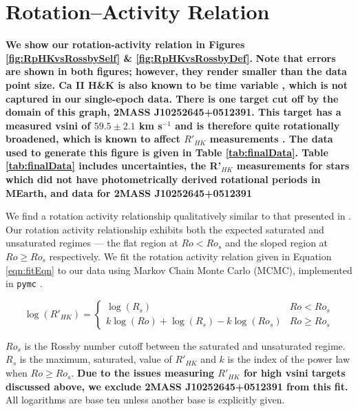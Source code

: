 \section{Rotation--Activity Relation}\label{sec:results}
\textbf{We show our rotation-activity relation in Figures
\ref{fig:RpHKvsRossbySelf} \& \ref{fig:RpHKvsRossbyDef}. }\textbf{Note that
errors are shown in both figures; however, they render smaller than the data
point size. Ca II H\&K is also known to be time variable
\citep[e.g.][]{Baroch2020,Perdelwitz2021}, which is not captured in our
single-epoch data. There is one target cut off by the domain of this graph,
2MASS J10252645+0512391. This target has a measured vsini of $59.5\pm2.1$ km
s$^{-1}$ \citep{Kesseli2018} and is therefore quite rotationally broadened, which
is known to affect $R'_{HK}$ measurements \citep[figure 8]{Schroder2009}. The
data used to generate this figure is given in Table \ref{tab:finalData}. Table
\ref{tab:finalData} includes uncertainties, the R'$_{HK}$ measurements for
stars which did not have photometrically derived rotational periods in MEarth,
and data for 2MASS J10252645+0512391}

We find a rotation activity relationship qualitatively similar to that
presented in \citet{Def17}. Our rotation activity relationship exhibits both
the expected saturated and unsaturated regimes --- the flat region at $Ro <
Ro_{s}$ and the sloped region at $Ro \geq Ro_{s}$ respectively. We fit the
rotation activity relation given in Equation \ref{eqn:fitEqn} to our data using
Markov Chain Monte Carlo (MCMC), implemented in \texttt{pymc}
\citep{Salvatier2016}. 

{\scriptsize
    \begin{equation}\label{eqn:fitEqn}
        \log(R'_{HK}) = \begin{cases}
            \log(R_{s}) & Ro < Ro_{s} \\
            k\log(Ro) + \log(R_{s}) - k\log(Ro_{s}) & Ro \geq Ro_{s}
        \end{cases}
    \end{equation}
}

\noindent $Ro_{s}$ is the Rossby number cutoff between the saturated and
unsaturated regime. $R_{s}$ is the maximum, saturated, value of $R'_{HK}$ and
$k$ is the index of the power law when $Ro \geq Ro_{s}$. \textbf{Due to the
issues measuring $R'_{HK}$ for high vsini targets discussed above, we exclude
2MASS J10252645+0512391 from this fit.} All logarithms are base ten unless
another base is explicitly given.

